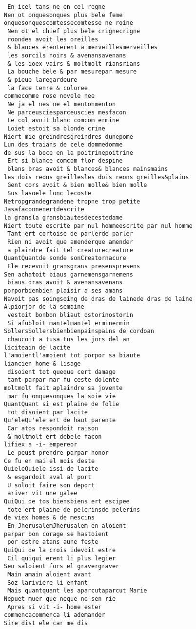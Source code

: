 \documentclass[
  letterpaper,
  DIV=11,
  numbers=noendperiod]{scrreprt}
\begin{document}
\begin{verbatim}
 En icel tans ne en cel regne
Nen ot onquesonques plus bele feme
onquesonquescomtessecomtesse ne roine
 Nen ot el chief plus bele crignecrigne
 roondes avoit les oreilles
 & blances erenterent a merveillesmerveilles
 les sorcils noirs & avenansavenans
 & les ioex vairs & moltmolt riansrians
 La bouche bele & par mesurepar mesure
 & pieue laregardeure
 la face tenre & coloree
commecomme rose novele nee
 Ne ja el nes ne el mentonmenton
 Ne parceusciesparceuscies mesfacon
 Le col avoit blanc comcom ermine
 Loiet estoit sa blonde crine
Niert mie greindresgreindres dunepome
Lun des traians de cele dommedomme
de sus la boce en la poitrinepoitrine
 Ert si blance comcom flor despine
 blans bras avoit & blances& blances mainsmains
les dois reons greillesles dois reons greilles&plains
 Gent cors avoit & bien molle& bien molle
 Sus lasoele lonc lecoste
Netropgrandegrandene tropne trop petite
Jasafaconnenertdescrite
la gransla gransbiautesdecestedame
Niert toute escrite par nul hommeescrite par nul homme
 Tant ert cortoise de parlerde parler
 Rien ni avoit que amenderque amender
 a plaindre fait tel creaturecreature
QuantQuantde sonde sonCreatornacure
 Ele recevoit gransgrans presenspresens
Sen achatoit biaus garnemensgarnemens
 biaus dras avoit & avenansavenans
porporbienbien plaisir a ses amans
Navoit pas soingsoing de dras de lainede dras de laine
Alpiorjor de la semaine
 vestoit bonbon bliaut ostorinostorin
 Si afubloit mantelmantel erminermin
SollersSollersbienbienpainspains de cordoan
 chaucoit a tusa tus les jors del an
liciteain de lacite
l'amoientl'amoient tot porpor sa biaute
liancien home & lisage
 disoient tot queque cert damage
 tant parpar mar fu ceste dolente
moltmolt fait aplaindre sa jovente
 mar fu onquesonques la soie vie
QuantQuant si est plaine de folie
 tot disoient par lacite
Qu'eleQu'ele ert de haut parente
 Car atos respondoit raison
 & moltmolt ert debele facon
lifiex a -i- empereor
 Le peust prendre parpar honor
Ce fu en mai el mois deste
QuieleQuiele issi de lacite
 & esgardoit aval al port
 U soloit faire son deport
 ariver vit une galee
QuiQui de tos biensbiens ert escipee
 tote ert plaine de pelerinsde pelerins
de viex homes & de mescins
 En JherusalemJherusalem en aloient
parpar bon corage se hastoient
 por estre atans aune feste
QuiQui de la crois idevoit estre
 Cil quiqui erent li plus legier
Sen saloient fors el gravergraver
 Main amain aloient avant
 Soz lariviere li enfant
 Mais quantquant les aparcutaparcut Marie
Nepuet muer que neque ne sen rie 
 Apres si vit -i- home ester
commencacommenca li ademander
Sire dist ele car me dis

\end{verbatim}
\end{document}
